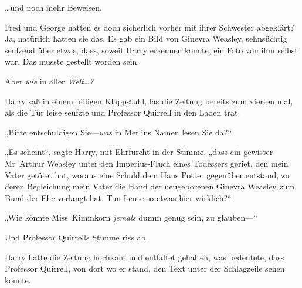 …und noch mehr Beweisen.

Fred und George hatten es doch sicherlich vorher mit ihrer Schwester abgeklärt? Ja, natürlich hatten sie das. Es gab ein Bild von Ginevra Weasley, sehnsüchtig seufzend über etwas, dass, soweit Harry erkennen konnte, ein Foto von ihm selbst war. Das musste gestellt worden sein.

Aber \emph{wie} in aller \emph{Welt…?}

Harry saß in einem billigen Klappstuhl, las die Zeitung bereits zum vierten mal, als die Tür leise seufzte und Professor Quirrell in den Laden trat.

„Bitte entschuldigen Sie—\emph{was} in Merlins Namen lesen Sie da?“

„Es scheint“, sagte Harry, mit Ehrfurcht in der Stimme, „dass ein gewisser Mr~Arthur Weasley unter den Imperius-Fluch eines Todessers geriet, den mein Vater getötet hat, woraus eine Schuld dem Haus Potter gegenüber entstand, zu deren Begleichung mein Vater die Hand der neugeborenen Ginevra Weasley zum Bund der Ehe verlangt hat. Tun Leute so etwas hier wirklich?“

„Wie könnte Miss~Kimmkorn \emph{jemals} dumm genug sein, zu glauben—“

Und Professor Quirrells Stimme riss ab.

Harry hatte die Zeitung hochkant und entfaltet gehalten, was bedeutete, dass Professor Quirrell, von dort wo er stand, den Text unter der Schlagzeile sehen konnte.

